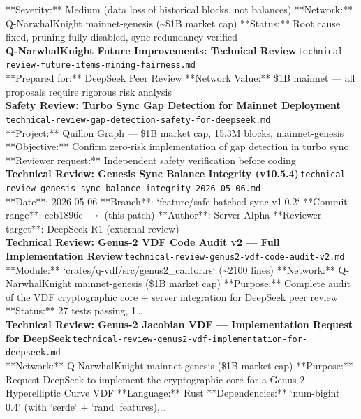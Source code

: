 \documentclass[11pt,a4paper]{article}
\begin{document}
**Severity:** Medium (data loss of historical blocks, not balances) **Network:** Q-NarwhalKnight mainnet-genesis (\textasciitilde{}\$1B market cap) **Status:** Root cause fixed, pruning fully disabled, sync redundancy verified\\[6pt]
\noindent\textbf{Q-NarwhalKnight Future Improvements: Technical Review}\,\textcolor{qgray}{\small \texttt{technical-review-future-items-mining-fairness.md}}\\
**Prepared for:** DeepSeek Peer Review **Network Value:** \$1B mainnet --- all proposals require rigorous risk analysis\\[6pt]
\noindent\textbf{Safety Review: Turbo Sync Gap Detection for Mainnet Deployment}\,\textcolor{qgray}{\small \texttt{technical-review-gap-detection-safety-for-deepseek.md}}\\
**Project:** Quillon Graph --- \$1B market cap, 15.3M blocks, mainnet-genesis **Objective:** Confirm zero-risk implementation of gap detection in turbo sync **Reviewer request:** Independent safety verification before coding\\[6pt]
\noindent\textbf{Technical Review: Genesis Sync Balance Integrity (v10.5.4)}\,\textcolor{qgray}{\small \texttt{technical-review-genesis-sync-balance-integrity-2026-05-06.md}}\\
**Date**: 2026-05-06 **Branch**: `feature/safe-batched-sync-v1.0.2` **Commit range**: ceb1896c $\rightarrow$ (this patch) **Author**: Server Alpha **Reviewer target**: DeepSeek R1 (external review)\\[6pt]
\noindent\textbf{Technical Review: Genus-2 VDF Code Audit v2 --- Full Implementation Review}\,\textcolor{qgray}{\small \texttt{technical-review-genus2-vdf-code-audit-v2.md}}\\
**Module:** `crates/q-vdf/src/genus2\_cantor.rs` (\textasciitilde{}2100 lines) **Network:** Q-NarwhalKnight mainnet-genesis (\$1B market cap) **Purpose:** Complete audit of the VDF cryptographic core + server integration for DeepSeek peer review **Status:** 27 tests passing, 1\ldots{}\\[6pt]
\noindent\textbf{Technical Review: Genus-2 Jacobian VDF --- Implementation Request for DeepSeek}\,\textcolor{qgray}{\small \texttt{technical-review-genus2-vdf-implementation-for-deepseek.md}}\\
**Network:** Q-NarwhalKnight mainnet-genesis (\$1B market cap) **Purpose:** Request DeepSeek to implement the cryptographic core for a Genus-2 Hyperelliptic Curve VDF **Language:** Rust **Dependencies:** `num-bigint 0.4` (with `serde` + `rand` features),\ldots{}\\[6pt]
\end{document}
